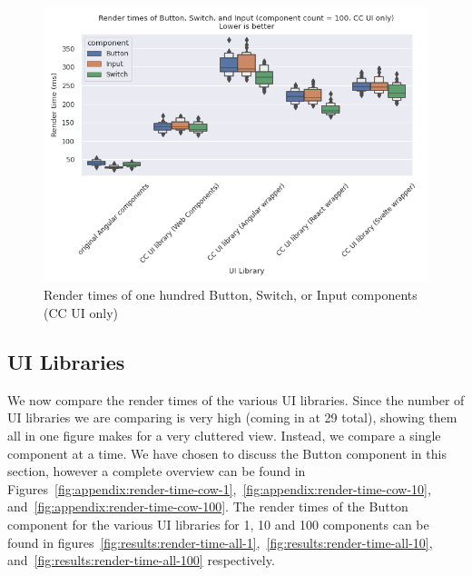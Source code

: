 \begin{figure}[h]
	\includegraphics[width=\columnwidth]{plots/render-time-cow-100.png}
	\caption{Render times of one hundred Button, Switch, or Input components (CC UI only)}
	\label{fig:results:render-time-cow-100}
	\centering
\end{figure}

\subsection{UI Libraries}
We now compare the render times of the various UI libraries. Since the number of UI libraries we are comparing is very high (coming in at 29 total), showing them all in one figure makes for a very cluttered view. Instead, we compare a single component at a time. We have chosen to discuss the Button component in this section, however a complete overview can be found in Figures~\ref{fig:appendix:render-time-cow-1},~\ref{fig:appendix:render-time-cow-10}, and~\ref{fig:appendix:render-time-cow-100}. The render times of the Button component for the various UI libraries for 1, 10 and 100 components can be found in figures~\ref{fig:results:render-time-all-1},~\ref{fig:results:render-time-all-10}, and~\ref{fig:results:render-time-all-100} respectively.

